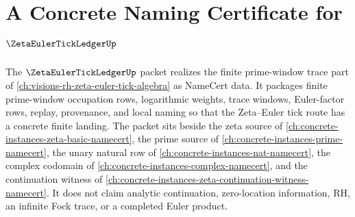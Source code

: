 \chapter{A Concrete Naming Certificate for $\ZetaEulerTickLedgerUp$}
\label{ch:concrete-instances-zeta-euler-tick-ledger-namecert}

The $\ZetaEulerTickLedgerUp$ packet realizes the finite prime-window trace part of \autoref{ch:visions-rh-zeta-euler-tick-algebra} as NameCert data. It packages finite prime-window occupation rows, logarithmic weights, trace windows, Euler-factor rows, replay, provenance, and local naming so that the Zeta--Euler tick route has a concrete finite landing. The packet sits beside the zeta source of \autoref{ch:concrete-instances-zeta-basic-namecert}, the prime source of \autoref{ch:concrete-instances-prime-namecert}, the unary natural row of \autoref{ch:concrete-instances-nat-namecert}, the complex codomain of \autoref{ch:concrete-instances-complex-namecert}, and the continuation witness of \autoref{ch:concrete-instances-zeta-continuation-witness-namecert}. It does not claim analytic continuation, zero-location information, RH, an infinite Fock trace, or a completed Euler product.

